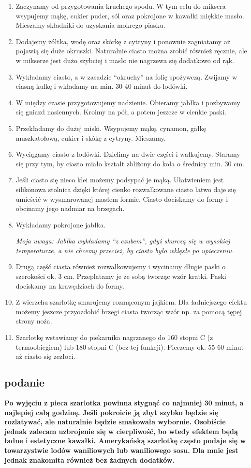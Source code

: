 \documentclass[16pt, letterpaper, titlepage]{article}
\begin{document}
\begin{enumerate}
\item Zaczynamy od przygotowania kruchego spodu.
W tym celu do miksera wsypujemy mąkę, cukier puder, sól oraz pokrojone w kawałki miękkie masło. Mieszamy składniki do uzyskania mokrego piasku.
\item Dodajemy żółtka, wodę oraz skórkę z cytryny i ponownie zagniatamy aż pojawią się duże okruszki.
Naturalnie ciasto można zrobić również ręcznie, ale w mikserze jest dużo szybciej i masło nie nagrzewa się dodatkowo od rąk.
\item Wykładamy ciasto, a w zasadzie “okruchy” na folię spożywczą. Zwijamy w ciasną kulkę i wkładamy na min. 30-40 minut do lodówki.
\item W między czasie przygotowujemy nadzienie. Obieramy jabłka i pozbywamy się gniazd nasiennych. Kroimy na pół, a potem jeszcze w cienkie paski.
\item Przekładamy do dużej miski. Wsypujemy mąkę, cynamon, gałkę muszkatołową, cukier i skókę z cytryny. Mieszamy.
\item Wyciągamy ciasto z lodówki. Dzielimy na dwie części i wałkujemy. Staramy się przy tym, by ciasto miało kształt zbliżony do koła o średnicy min. 30 cm.
\item Jeśli ciasto się nieco klei możemy podsypać je mąką. Ułatwieniem jest silikonowa stolnica dzięki której cienko rozwałkowane ciasto łatwo daje się umieścić w wysmarowanej masłem formie. Ciasto dociskamy do formy i obcinamy jego nadmiar na brzegach.
\item Wykładamy pokrojone jabłka.

\textit{Moja uwaga:
Jabłka wykładamy “z czubem”, gdyż skurczą się w wysokiej temperaturze, a nie chcemy przecież, by ciasto było wklęsłe po upieczeniu.}
\item Drugą część ciasta również rozwałkowujemy i wycinamy długie paski o szerokości ok. 3 cm. Przeplatamy je ze sobą tworząc wzór kratki. Paski dociskamy na krawędziach do formy.
\item Z wierzchu szarlotkę smarujemy rozmąconym jajkiem. Dla ładniejszego efektu możemy jeszcze przyozdobić brzegi ciasta tworząc wzór np. za pomocą tępej strony noża.
\item Szarlotkę wstawiamy do piekarnika nagrzanego do 160 stopni C (z termoobiegiem) lub 180 stopni C (bez tej funkcji). Pieczemy ok. 55-60 minut aż ciasto się zezłoci.
\end{enumerate}
\begin{center}
\subsection*{podanie}
\end{center}
\textbf{Po wyjęciu z pieca szarlotka powinna stygnąć co najmniej 30 minut, a najlepiej całą godzinę. Jeśli pokroicie ją zbyt szybko będzie się rozlatywać, ale naturalnie będzie smakowała wybornie. Osobiście jednak zalecam uzbrojenie się w cierpliwość, bo wtedy efektem będą ładne i estetyczne kawałki.
Amerykańską szarlotkę często podaje się w towarzystwie lodów waniliowych lub waniliowego sosu.
Dla mnie jest jednak znakomita również bez żadnych dodatków.}
\end{document}
